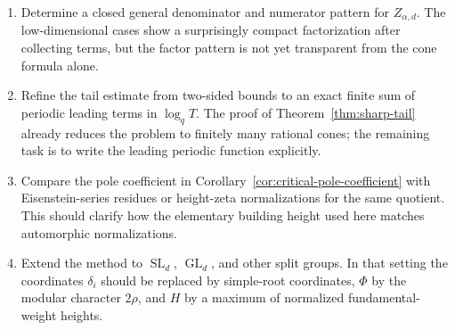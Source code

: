 \documentclass[11pt]{amsart}
\newcommand{\GL}{\operatorname{GL}}
\newcommand{\SL}{\operatorname{SL}}
\theoremstyle{plain}
\theoremstyle{definition}
\numberwithin{equation}{section}
\begin{document}
\begin{enumerate}[label=(\arabic*)]
\item Determine a closed general denominator and numerator pattern for $Z_{\alpha,d}$.
The low-dimensional cases show a surprisingly compact factorization after collecting terms, but the
factor pattern is not yet transparent from the cone formula alone.
\item Refine the tail estimate from two-sided bounds to an exact finite sum of periodic
leading terms in $\log_qT$.  The proof of Theorem~\ref{thm:sharp-tail} already reduces the problem
to finitely many rational cones; the remaining task is to write the leading periodic function
explicitly.
\item Compare the pole coefficient in Corollary~\ref{cor:critical-pole-coefficient} with Eisenstein-series residues
or height-zeta normalizations for the same quotient.  This should clarify how the elementary
building height used here matches automorphic normalizations.
\item Extend the method to $\SL_d$, $\GL_d$, and other split groups.  In that setting the
coordinates $\delta_i$ should be replaced by simple-root coordinates, $\Phi$ by the modular
character $2\rho$, and $H$ by a maximum of normalized fundamental-weight heights.
\end{enumerate}
\end{document}
